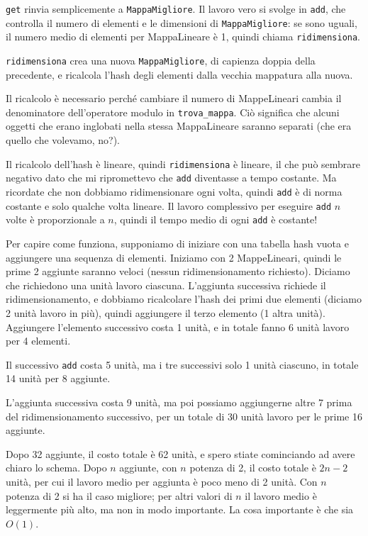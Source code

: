 \documentclass[10pt]{book}
\begin{document}
{\tt get} rinvia semplicemente a {\tt MappaMigliore}.  Il lavoro vero si svolge in {\tt add}, che controlla il numero di elementi e le dimensioni di
{\tt MappaMigliore}: se sono uguali, il numero medio di elementi per MappaLineare è 1, quindi chiama {\tt ridimensiona}.

{\tt ridimensiona} crea una nuova {\tt MappaMigliore}, di capienza doppia della precedente, e ricalcola l'hash degli elementi dalla vecchia mappatura alla nuova.

Il ricalcolo è necessario perché cambiare il numero di MappeLineari cambia il denominatore dell'operatore modulo in \verb"trova_mappa".  Ciò significa che alcuni oggetti che erano inglobati nella stessa MappaLineare saranno separati (che era quello che volevamo, no?).

Il ricalcolo dell'hash è lineare, quindi {\tt ridimensiona} è lineare, il che può sembrare negativo dato che mi ripromettevo che {\tt add} diventasse a tempo costante.  Ma ricordate che non dobbiamo ridimensionare ogni volta, quindi {\tt add} è di norma costante e solo qualche volta lineare. Il lavoro complessivo per eseguire {\tt add} $n$ volte è proporzionale a $n$, quindi il tempo medio di ogni {\tt add} è costante!

Per capire come funziona, supponiamo di iniziare con una tabella hash vuota e aggiungere una sequenza di elementi. Iniziamo con 2 MappeLineari, quindi le prime 2 aggiunte saranno veloci (nessun ridimensionamento richiesto). Diciamo che richiedono una unità lavoro ciascuna. L'aggiunta successiva richiede il ridimensionamento, e dobbiamo ricalcolare l'hash dei primi due elementi (diciamo 2 unità lavoro in più), quindi aggiungere il terzo elemento (1 altra unità). Aggiungere l'elemento successivo costa 1 unità, e in totale fanno 6 unità lavoro per 4 elementi.

Il successivo {\tt add} costa 5 unità, ma i tre successivi solo 1 unità ciascuno, in totale 14 unità per 8 aggiunte.

L'aggiunta successiva costa 9 unità, ma poi possiamo aggiungerne altre 7 prima del ridimensionamento successivo, per un totale di 30 unità lavoro per le prime 16 aggiunte.

Dopo 32 aggiunte, il costo totale è 62 unità, e spero stiate cominciando ad avere chiaro lo schema. Dopo $n$ aggiunte, con $n$ potenza di 2, il costo totale è $2n-2$ unità, per cui il lavoro medio per aggiunta è poco meno di 2 unità. Con $n$ potenza di 2 si ha il caso migliore; per altri valori di $n$ il lavoro medio è leggermente più alto, ma non in modo importante. La cosa importante è che sia
$O(1)$.
\end{document}
